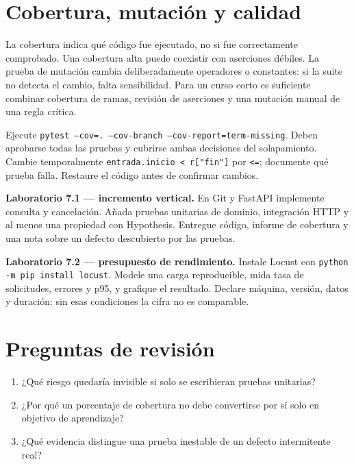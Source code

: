 \section{Cobertura, mutación y calidad}

La cobertura indica qué código fue ejecutado, no si fue correctamente comprobado. Una cobertura alta puede coexistir con aserciones débiles. La prueba de mutación cambia deliberadamente operadores o constantes: si la suite no detecta el cambio, falta sensibilidad. Para un curso corto es suficiente combinar cobertura de ramas, revisión de aserciones y una mutación manual de una regla crítica.

\begin{validacion}
Ejecute \texttt{pytest --cov=. --cov-branch --cov-report=term-missing}. Deben aprobarse todas las pruebas y cubrirse ambas decisiones del solapamiento. Cambie temporalmente \texttt{entrada.inicio < r["fin"]} por \texttt{<=}; documente qué prueba falla. Restaure el código antes de confirmar cambios.
\end{validacion}

\begin{ejercicio}
\textbf{Laboratorio 7.1 --- incremento vertical.} En Git y FastAPI implemente consulta y cancelación. Añada pruebas unitarias de dominio, integración HTTP y al menos una propiedad con Hypothesis. Entregue código, informe de cobertura y una nota sobre un defecto descubierto por las pruebas.

\textbf{Laboratorio 7.2 --- presupuesto de rendimiento.} Instale Locust con \texttt{python -m pip install locust}. Modele una carga reproducible, mida tasa de solicitudes, errores y p95, y grafique el resultado. Declare máquina, versión, datos y duración: sin esas condiciones la cifra no es comparable.
\end{ejercicio}

\section{Preguntas de revisión}

\begin{enumerate}
  \item ¿Qué riesgo quedaría invisible si solo se escribieran pruebas unitarias?
  \item ¿Por qué un porcentaje de cobertura no debe convertirse por sí solo en objetivo de aprendizaje?
  \item ¿Qué evidencia distingue una prueba inestable de un defecto intermitente real?
\end{enumerate}
